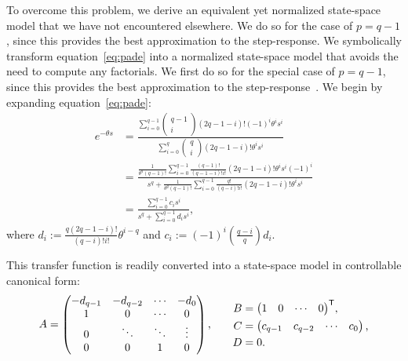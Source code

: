 To overcome this problem, we derive an equivalent yet normalized state-space model that we have not encountered elsewhere.
We do so for the case of $p = q - 1$, since this provides the best approximation to the step-response. We symbolically transform equation~\ref{eq:pade} into a normalized state-space model that avoids the need to compute any factorials.
We first do so for the special case of $p = q - 1$, since this provides the best approximation to the step-response~\citep{vajta2000some}.
We begin by expanding equation~\ref{eq:pade}:
\begin{align*}
[q-1/q]e^{-\theta s} &= \frac{\sum_{i=0}^{q-1} \begin{pmatrix}{q-1} \\ i\end{pmatrix} (2q - 1 - i)! (-1)^i \theta^i s^i}{\sum_{i=0}^q \begin{pmatrix}q \\ i\end{pmatrix} (2q - 1 - i)! \theta^i s^i} \\
&= \frac{\frac{1}{\theta^{q} (q-1)!} \sum_{i=0}^{q-1} \frac{(q-1)!}{(q-1-i)!i!} (2q - 1- i)! \theta^i s^i (-1)^i}{s^q + \frac{1}{\theta^q (q-1)!}  \sum_{i=0}^{q-1} \frac{q!}{(q-i)!i!} (2q - 1 - i)! \theta^i s^i} \\
&= \frac{\sum_{i=0}^{q-1} c_i s^i}{s^q + \sum_{i=0}^{q-1} d_i s^i} \text{,}
\end{align*}
where $d_i := \frac{q(2q - 1 - i)!}{(q-i)!i!} \theta^{i-q}$ and $c_i := (-1)^i \left( \frac{q-i}{q} \right) d_i$.

This transfer function is readily converted into a state-space model in controllable canonical form:
\begin{equation*}
    \begin{alignedat}{2}
        A &= \begin{pmatrix} -d_{q-1} & -d_{q-2} & \cdots & -d_0 \\ 1 & 0 & \cdots & 0 \\ 0 & \ddots & \ddots & \vdots \\ 0 & 0 & 1 & 0\end{pmatrix} \text{,} & & \quad\quad \begin{alignedat}{1}
            B &= {\begin{pmatrix} 1 & 0 & \cdots & 0\end{pmatrix}}^\mathsf{T} \text{,} \\
            C &= \begin{pmatrix} c_{q-1} & c_{q-2} & \cdots & c_0\end{pmatrix} \text{,} \\
            D &= 0 \text{.}
        \end{alignedat}
    \end{alignedat}
\end{equation*}


